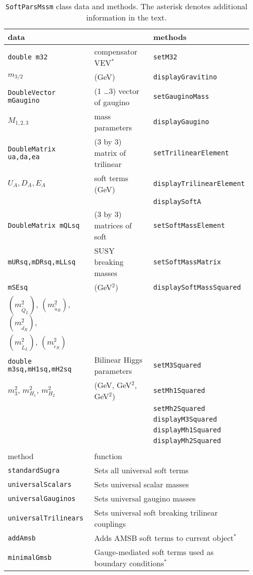 \documentclass[]{article}
\def\code#1{\small{\tt #1}\normalsize}
\begin{document}
\begin{table}\begin{center}\begin{tabular}{lll}
data & & methods \\ \hline
\code{double m32} &compensator VEV$^*$ & \code{setM32} \\
$m_{3/2}$ &(GeV) & \code{displayGravitino}\\ \hline
\code{DoubleVector mGaugino} & (1 \ldots 3) vector of gaugino &
\code{setGauginoMass} \\
$M_{1,2,3}$ & mass parameters & \code{displayGaugino} \\ \hline
\code{DoubleMatrix ua,da,ea} & (3 by 3) matrix of trilinear&
\code{setTrilinearElement}\\
$U_A,D_A,E_A$ & soft terms (GeV) &  \code{displayTrilinearElement}\\
 & & \code{displaySoftA} \\ \hline
\code{DoubleMatrix mQLsq} & (3 by 3) matrices of soft &
\code{setSoftMassElement} \\
\code{mURsq,mDRsq,mLLsq} & SUSY breaking masses & \code{setSoftMassMatrix}
\\
\code{mSEsq} & (GeV$^2$) & \code{displaySoftMassSquared} \\ 
$(m_{\tilde Q_L}^2)$, $(m_{\tilde u_R}^2)$, $(m_{\tilde d_R}^2)$,
& & \\ 
$(m_{\tilde L_L}^2)$, $(m_{\tilde e_R}^2)$  & & \\ \hline
\code{double m3sq,mH1sq,mH2sq} & Bilinear Higgs parameters & \code{setM3Squared}\\
$m_3^2$, $m_{H_1}^2$, $m_{H_2}^2$ & (GeV, GeV$^2$, GeV$^2$) & \code{setMh1Squared}\\
 & & \code{setMh2Squared} \\
 & & \code{displayM3Squared} \\
 & & \code{displayMh1Squared} \\
 & & \code{displayMh2Squared} \\ 
\\
method & \multicolumn{2}{l}{function}\\ \hline
\code{standardSugra} & \multicolumn{2}{l}{Sets all universal soft terms}\\
\code{universalScalars} & \multicolumn{2}{l}{Sets universal scalar masses}\\ 
\code{universalGauginos} & \multicolumn{2}{l}{Sets universal gaugino masses}\\ 
\code{universalTrilinears} & \multicolumn{2}{l}{Sets universal soft breaking trilinear
couplings}\\  
\code{addAmsb} & \multicolumn{2}{l}{Adds AMSB soft terms to current
object$^*$}\\ 
\code{minimalGmsb} & \multicolumn{2}{l}{Gauge-mediated soft terms used as
boundary conditions$^*$}\\ 
\hline
\end{tabular}
\caption{ \label{tab:softparsmssm} \code{SoftParsMssm} class data and methods. The asterisk denotes additional information in the text.}\end{center}\end{table}
\end{document}
